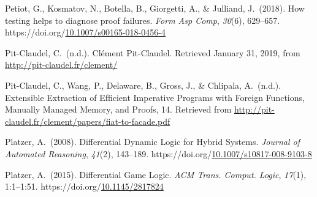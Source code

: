\documentclass[12pt,twoside]{article}
\begin{document}
{\begin{thebibliography}{222}
\mdbibitemlabel{}Petiot, G., Kosmatov, N., Botella, B., Giorgetti, A., \& Julliand, J.~(2018). How testing helps to diagnose proof failures. \emph{Form Asp Comp}, \emph{30}(6), 629–657. https://doi.org/\href{https://dx.doi.org/10.1007/s00165-018-0456-4}{10.1007/s00165-018-0456-4}\label{petiot_how_2018}%

\mdbibitemlabel{}Pit-Claudel, C.~(n.d.). Clément Pit-Claudel. Retrieved January 31, 2019, from \href{http://pit-claudel.fr/clement/}{{\ttfamily http://\hspace{0pt}pit-\hspace{0pt}claudel.\hspace{0pt}fr/\hspace{0pt}clement/\hspace{0pt}}}\label{pit-claudel_clement_nodate}%

\mdbibitemlabel{}Pit-Claudel, C., Wang, P., Delaware, B., Gross, J., \& Chlipala, A.~(n.d.). Extensible Extraction of Efﬁcient Imperative Programs with Foreign Functions, Manually Managed Memory, and Proofs, 14. Retrieved from \href{http://pit-claudel.fr/clement/papers/fiat-to-facade.pdf}{{\ttfamily http://\hspace{0pt}pit-\hspace{0pt}claudel.\hspace{0pt}fr/\hspace{0pt}clement/\hspace{0pt}papers/\hspace{0pt}fiat-\hspace{0pt}to-\hspace{0pt}facade.\hspace{0pt}pdf}}\label{pit-claudel_extensible_nodate}%

\mdbibitemlabel{}Platzer, A.~(2008). Differential Dynamic Logic for Hybrid Systems. \emph{Journal of Automated Reasoning}, \emph{41}(2), 143–189. https://doi.org/\href{https://dx.doi.org/10.1007/s10817-008-9103-8}{10.1007/s10817-008-9103-8}\label{platzer_differential_2008}%

\mdbibitemlabel{}Platzer, A.~(2015). Differential Game Logic. \emph{ACM Trans. Comput. Logic}, \emph{17}(1), 1:1–1:51. https://doi.org/\href{https://dx.doi.org/10.1145/2817824}{10.1145/2817824}\label{platzer_differential_2015}%


\end{thebibliography}}
\end{document}
